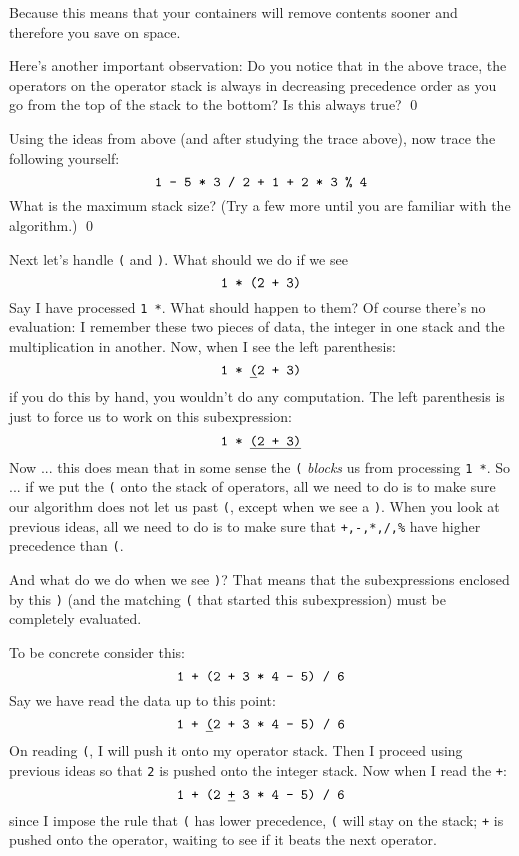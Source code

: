 Because this means that your containers will remove contents
sooner and therefore you save on space.

\begin{ex}
Here's another important observation:
Do you notice that in the above trace, the operators on the operator stack
is always in decreasing precedence order as you go from the top of the stack to the bottom?
Is this always true?
\qed
\end{ex}

\begin{ex}
Using the ideas from above (and after studying the trace above),
now trace the following yourself:
\[
\text{\texttt{1 - 5 * 3 / 2 + 1 + 2 * 3 \% 4}}
\]
What is the maximum stack size?
(Try a few more until you are familiar with the algorithm.)
\qed
\end{ex}

Next let's handle \texttt{(} and \texttt{)}.
What should we do if we see
\[
\text{\texttt{1 * (2 + 3)}}
\]
Say I have processed \texttt{1 *}.
What should happen to them?
Of course there's no evaluation: I remember these two
pieces of data, the integer in one stack and the multiplication
in another.
Now, when I see the left parenthesis:
\[
\text{\texttt{1 * \underline{(}2 + 3)}}
\]
if you do this by hand, you wouldn't do any computation.
The left parenthesis is just to force us to work on this
subexpression:
\[
\text{\texttt{1 * \underline{(2 + 3)}}}
\]
Now ... this does mean that in some sense the \texttt{(}
\textit{blocks} us from processing \texttt{1 *}.
So ... if we put the \texttt{(} onto the stack of operators,
all we need to do is to make sure our algorithm does not let us past
\texttt{(}, except when we see a \texttt{)}.
When you look at previous ideas, all we need to do is to make sure that
\texttt{+,-,*,/,\%} have higher precedence than \texttt{(}.

And what do we do when we see \texttt{)}?
That means that the subexpressions enclosed by this \texttt{)}
(and the matching \texttt{(} that started this subexpression)
must be completely evaluated.

To be concrete consider this:
\[
\text{\texttt{1 + (2 + 3 * 4 - 5) / 6}}
\]
Say we have read the data up to this point:
\[
\text{\texttt{1 + \underline{(}2 + 3 * 4 - 5) / 6}}
\]
On reading \texttt{(}, I will push it onto my operator stack.
Then I proceed using previous ideas so that \texttt{2} is
pushed onto the integer stack.
Now when I read the \texttt{+}:
\[
\text{\texttt{1 + (2 \underline{+} 3 * 4 - 5) / 6}}
\]
since I impose the rule that \texttt{(} has lower precedence,
\texttt{(} will stay on the stack; \texttt{+} is pushed onto the
operator, waiting to see if it beats the next operator.

